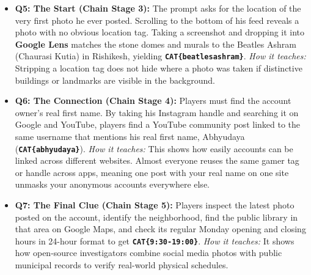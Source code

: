 \documentclass[11pt,a4paper]{article}
\begin{document}
\begin{itemize}
    \item \textbf{Q5: The Start (Chain Stage 3):} The prompt asks for the location of the very first photo he ever posted. Scrolling to the bottom of his feed reveals a photo with no obvious location tag. Taking a screenshot and dropping it into \textbf{Google Lens} matches the stone domes and murals to the Beatles Ashram (Chaurasi Kutia) in Rishikesh, yielding \textbf{\texttt{CAT\{beatlesashram\}}}. \textit{How it teaches:} Stripping a location tag does not hide where a photo was taken if distinctive buildings or landmarks are visible in the background.
    \item \textbf{Q6: The Connection (Chain Stage 4):} Players must find the account owner's real first name. By taking his Instagram handle and searching it on Google and YouTube, players find a YouTube community post linked to the same username that mentions his real first name, Abhyudaya (\textbf{\texttt{CAT\{abhyudaya\}}}). \textit{How it teaches:} This shows how easily accounts can be linked across different websites. Almost everyone reuses the same gamer tag or handle across apps, meaning one post with your real name on one site unmasks your anonymous accounts everywhere else.
    \item \textbf{Q7: The Final Clue (Chain Stage 5):} Players inspect the latest photo posted on the account, identify the neighborhood, find the public library in that area on Google Maps, and check its regular Monday opening and closing hours in 24-hour format to get \textbf{\texttt{CAT\{9:30-19:00\}}}. \textit{How it teaches:} It shows how open-source investigators combine social media photos with public municipal records to verify real-world physical schedules.
\end{itemize}
\end{document}
